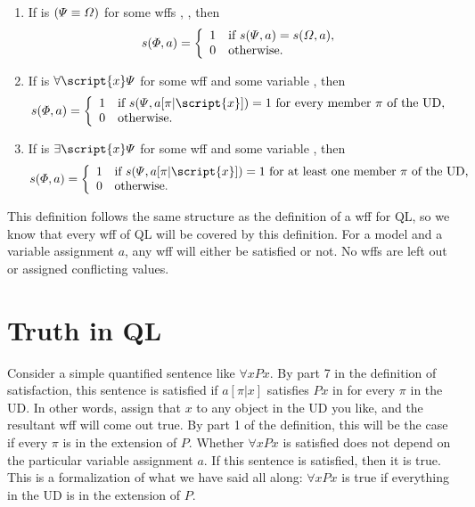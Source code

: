 \begin{enumerate}
\item If \metaA{} is $(\varPsi{}\equiv\varOmega{})$ for some wffs \metaB{}, \metaC{}, then
\begin{displaymath}s(\varPhi{}, a) =
	\left\{\begin{array}{ll}
	1 & \mbox{if $s(\varPsi{}, a) = s(\varOmega{}, a)$},\\
	0 & \mbox{otherwise.}
	\end{array}\right.
\end{displaymath}

\item If \metaA{} is $\forall\script{x} \metaB{}$ for some wff \metaB{} and some variable , then
\begin{displaymath}s(\metaA{}, a) =
	\left\{\begin{array}{ll}
	1 & \mbox{if $s(\metaB{}, a[\pi|\script{x}])=1$ for every member $\pi$ of the UD},\\
	0 & \mbox{otherwise.}
	\end{array}\right.
\end{displaymath}

\item If \metaA{} is $\exists\script{x} \metaB{}$ for some wff \metaB{} and some variable , then
\begin{displaymath}s(\metaA{}, a) =
	\left\{\begin{array}{ll}
	1 & \mbox{if $s(\metaB{}, a[\pi|\script{x}])=1$ for at least one member $\pi$ of the UD},\\
	0 & \mbox{otherwise.}
	\end{array}\right.
\end{displaymath}
\end{enumerate}
 
This definition follows the same structure as the definition of a wff for QL, so we know that every wff of QL will be covered by this definition. For a model  and a variable assignment $a$, any wff will either be satisfied or not. No wffs are left out or assigned conflicting values.




\section{Truth in QL}

Consider a simple quantified sentence like $\forall xPx$. By part 7 in the definition of satisfaction, this sentence is satisfied if $a[\pi|x]$ satisfies $Px$ in  for every $\pi$ in the UD. In other words, assign that $x$ to any object in the UD you like, and the resultant wff will come out true. By part 1 of the definition, this will be the case if every $\pi$ is in the extension of $P$. Whether $\forall xPx$ is satisfied does not depend on the particular variable assignment $a$. If this sentence is satisfied, then it is true. This is a formalization of what we have said all along: $\forall xPx$ is true if everything in the UD is in the extension of $P$.

